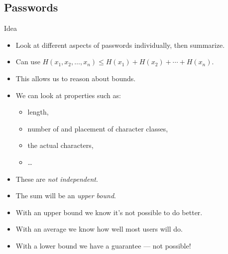 \documentclass{beamer}
\begin{document}
\subsection{Passwords}

\begin{frame}
  \begin{block}{Idea~\cite{Komanduri2011opa}}
    \begin{itemize}
      \item Look at different aspects of passwords individually, then 
        summarize.
      \item Can use \(H(x_1, x_2, \ldots, x_n) \leq H(x_1) + H(x_2) + \cdots 
          + H(x_n)\).
      \item This allows us to reason about bounds.
    \end{itemize}
  \end{block}
\end{frame}

\begin{frame}
  \begin{example}
    \begin{itemize}
      \item We can look at properties such as:
        \begin{itemize}
          \item length,
          \item number of and placement of character classes,
          \item the actual characters,
          \item \dots
        \end{itemize}
    \end{itemize}
  \end{example}

  \pause{}

  \begin{remark}
    \begin{itemize}
      \item These are \emph{not independent}.
      \item The sum will be an \emph{upper bound}.
    \end{itemize}
  \end{remark}
\end{frame}

\begin{frame}
  \begin{remark}
    \begin{itemize}
      \item With an upper bound we know it's not possible to do better.
      \item With an average we know how well most users will do.
      \item With a lower bound we have a guarantee --- not possible!
    \end{itemize}
  \end{remark}
\end{frame}
\end{document}
